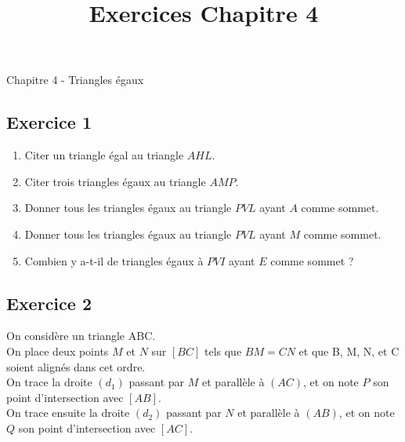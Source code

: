 \documentclass[12 pt]{extarticle}
\title{Exercices Chapitre 4}
\date{}
\theoremstyle{plain}
\newcounter{AlphNode}
\renewcommand*{\theAlphNode}{\Alph{AlphNode}}
\begin{document}
\begin{center}{\Large Chapitre 4 - Triangles égaux}\\
 \end{center} 
 
 \subsection*{Exercice 1}
 \begin{figure}[H]
 \center
 \end{figure}
  
  \begin{enumerate}
  \item Citer un triangle égal au triangle $AHL$. 
  \item Citer trois triangles égaux au triangle $AMP$. 
  \item Donner tous les triangles égaux au triangle $PVL$ ayant $A$ comme sommet.
   \item Donner tous les triangles égaux au triangle $PVL$ ayant $M$ comme sommet.
  \item Combien y a-t-il de triangles égaux à $PVI$ ayant $E$ comme sommet ? 
  \end{enumerate}
  
  \subsection*{Exercice 2}
  
 On considère un triangle ABC. \\
 On place deux points $M$ et $N$ sur $[BC]$ tels que $BM=CN$ 
 et que B, M, N, et C soient alignés dans cet ordre. \\
 On trace la droite $(d_1)$ passant par $M$ et parallèle à $(AC)$, et on note $P$ son point d'intersection avec $[AB]$. \\
 On trace ensuite la droite $(d_2)$ passant par $N$ et parallèle à $(AB)$, et on note $Q$ son point d'intersection avec $[AC]$. \\
 
\end{document}
